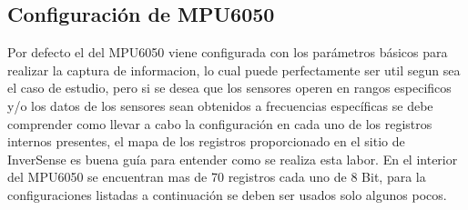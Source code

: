 \documentclass[12pt,a4paper]{article}
\begin{document}
\subsection{Configuración de MPU6050}
Por defecto el del MPU6050 viene configurada con los parámetros básicos para realizar la captura de informacion, lo cual puede perfectamente ser util segun sea el caso de estudio, pero si se desea que los sensores operen en rangos especificos y/o los datos de los sensores sean obtenidos a frecuencias específicas se debe comprender como llevar a cabo la configuración en cada uno de los registros internos presentes, el mapa de los registros \cite{MAPREGISTER} proporcionado  en el sitio de InverSense es buena guía para entender como se realiza esta labor.
\newline En el interior del MPU6050 se encuentran mas de 70 registros cada uno de 8 Bit, para la configuraciones listadas a continuación se deben ser usados solo algunos pocos.
\end{document}
